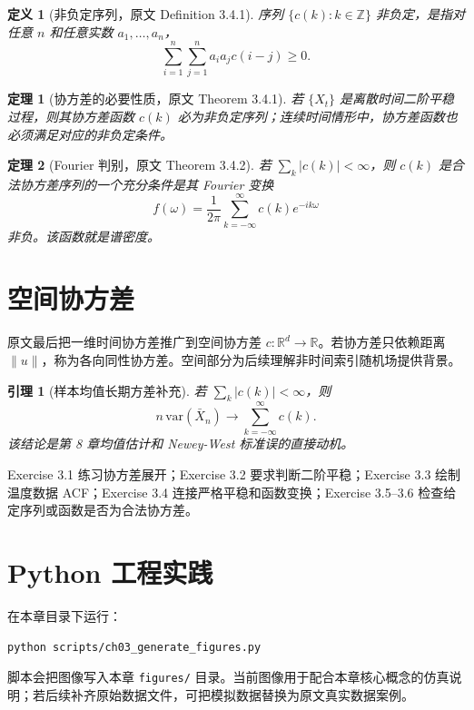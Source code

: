 \documentclass[11pt,a4paper]{ctexart}
\newtheorem{definition}{定义}[section]
\newtheorem{theorem}{定理}[section]
\newtheorem{lemma}{引理}[section]
\begin{document}
\begin{definition}[非负定序列，原文 Definition 3.4.1]
序列 \(\{c(k):k\in\mathbb Z\}\) 非负定，是指对任意 \(n\) 和任意实数 \(a_1,\ldots,a_n\)，
\[
  \sum_{i=1}^n\sum_{j=1}^n a_i a_j c(i-j)\ge0.
\]
\end{definition}

\begin{theorem}[协方差的必要性质，原文 Theorem 3.4.1]
若 \(\{X_t\}\) 是离散时间二阶平稳过程，则其协方差函数 \(c(k)\) 必为非负定序列；连续时间情形中，协方差函数也必须满足对应的非负定条件。
\end{theorem}

\begin{theorem}[Fourier 判别，原文 Theorem 3.4.2]
若 \(\sum_k |c(k)|<\infty\)，则 \(c(k)\) 是合法协方差序列的一个充分条件是其 Fourier 变换
\[
  f(\omega)=\frac1{2\pi}\sum_{k=-\infty}^{\infty}c(k)e^{-ik\omega}
\]
非负。该函数就是谱密度。
\end{theorem}

\section{空间协方差}

原文最后把一维时间协方差推广到空间协方差 \(c:\mathbb R^d\to\mathbb R\)。若协方差只依赖距离 \(\|u\|\)，称为各向同性协方差。空间部分为后续理解非时间索引随机场提供背景。

\begin{lemma}[样本均值长期方差补充]
若 \(\sum_k|c(k)|<\infty\)，则
\[
  n\,\mathrm{var}(\bar X_n)
  \to \sum_{k=-\infty}^{\infty}c(k).
\]
该结论是第 8 章均值估计和 Newey-West 标准误的直接动机。
\end{lemma}

Exercise 3.1 练习协方差展开；Exercise 3.2 要求判断二阶平稳；Exercise 3.3 绘制温度数据 ACF；Exercise 3.4 连接严格平稳和函数变换；Exercise 3.5--3.6 检查给定序列或函数是否为合法协方差。

\section{Python 工程实践}

在本章目录下运行：
\begin{lstlisting}[language=bash]
python scripts/ch03_generate_figures.py
\end{lstlisting}

脚本会把图像写入本章 \texttt{figures/} 目录。当前图像用于配合本章核心概念的仿真说明；若后续补齐原始数据文件，可把模拟数据替换为原文真实数据案例。
\end{document}
